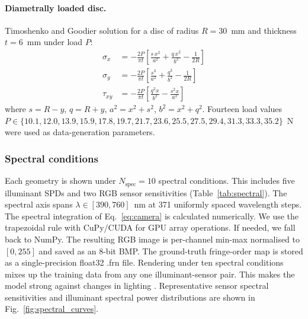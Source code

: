 \documentclass[review,12pt]{elsarticle}
\begin{document}
\paragraph{Diametrally loaded disc.}
Timoshenko and Goodier \cite{timoshenko1970} solution for a disc of radius
$R = 30$~mm and thickness $t = 6$~mm under load $P$:
\begin{align}
  \sigma_x &= -\frac{2P}{\pi t}\!\left[\frac{s\,x^2}{a^2}
               + \frac{q\,x^2}{b^2} - \frac{1}{2R}\right] \label{eq:disc_sx}\\
  \sigma_y &= -\frac{2P}{\pi t}\!\left[\frac{s^3}{a^2}
               + \frac{q^3}{b^2} - \frac{1}{2R}\right] \label{eq:disc_sy}\\
  \tau_{xy} &= -\frac{2P}{\pi t}\!\left[\frac{q^2 x}{b^2}
               - \frac{s^2 x}{a^2}\right] \label{eq:disc_txy}
\end{align}
where $s = R-y$, $q = R+y$, $a^2 = x^2+s^2$, $b^2 = x^2+q^2$. Fourteen
load values $P \in \{10.1, 12.0, 13.9, 15.9, 17.8, 19.7, 21.7, 23.6,
25.5, 27.5, 29.4, 31.3, 33.3, 35.2\}$~N were used as data-generation
parameters.

\subsubsection{Spectral conditions}
\label{sec:spectral}

Each geometry is shown under $N_\mathrm{spec} = 10$ spectral conditions. This includes five illuminant SPDs and two RGB sensor sensitivities (Table~\ref{tab:spectral}). The spectral axis spans $\lambda \in [390, 760]$~nm at 371 uniformly spaced wavelength steps. The spectral integration of Eq.~\eqref{eq:camera} is calculated numerically. We use the trapezoidal rule with CuPy/CUDA for GPU array operations. If needed, we fall back to NumPy. The resulting RGB image is per-channel min-max normalised to $[0,255]$ and saved as an 8-bit BMP. The ground-truth fringe-order map is stored as a single-precision float32 .frn file. Rendering under ten spectral conditions mixes up the training data from any one illuminant-sensor pair. This makes the model strong against changes in lighting \cite{ajovalasit2015,madhu2007b}.
Representative sensor spectral sensitivities and illuminant spectral power distributions are shown in Fig.~\ref{fig:spectral_curves}.
\end{document}
